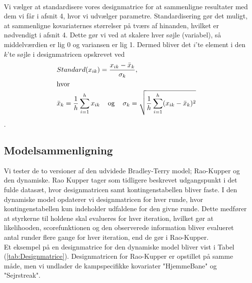\documentclass[11pt,a4paper]{article}
\begin{document}
\\ Vi vælger at standardisere vores designmatrice for at sammenligne resultater med dem vi får i afsnit 4, hvor vi udvælger parametre. Standardisering gør det muligt, at sammenligne kovariaternes størrelser på tværs af hinanden, hvilket er nødvendigt i afsnit 4. Dette gør vi ved at skalere hver søjle (variabel), så middelværdien er lig 0 og variansen er lig 1. Dermed bliver det $i$'te element i den $k$'te søjle i designmatricen opskrevet ved
\begin{align*}
    Standard(x_{ik}) &=\frac{x_{ik}-\Bar{x}_k}{\sigma_k},\\
    \intertext{hvor}
    \Bar{x}_k = \frac{1}{h}\sum_{i=1}^h{x_{ik}} &\text{\;\;\; og\;\;\; } \sigma_k = \sqrt{\frac{1}{h}\sum_{i=1}^h(x_{ik}-\Bar{x}_k)^2} 
\end{align*}.
\subsection{Modelsammenligning}
Vi tester de to versioner af den udvidede Bradley-Terry model; Rao-Kupper og den dynamiske. Rao Kupper tager som tidligere beskrevet udgangspunkt i det fulde datasæt, hvor designmatricen samt kontingenstabellen bliver faste. I den dynamiske model opdaterer vi designmatricen for hver runde, hvor kontingenstabellen kun indeholder udfaldene for den givne runde. Dette medfører at styrkerne til holdene skal evalueres for hver iteration, hvilket gør at likelihooden, scorefunktionen og den observerede information bliver evalueret antal runder flere gange for hver iteration, end de gør i Rao-Kupper.\\
Et eksempel på en designmatrice for den dynamiske model bliver vist i Tabel (\ref{tab:Designmatrice}). Designmatricen for Rao-Kupper er opstillet på samme måde, men vi undlader de kampspecifikke kovariater "HjemmeBane" og "Sejrstreak". 
\end{document}
